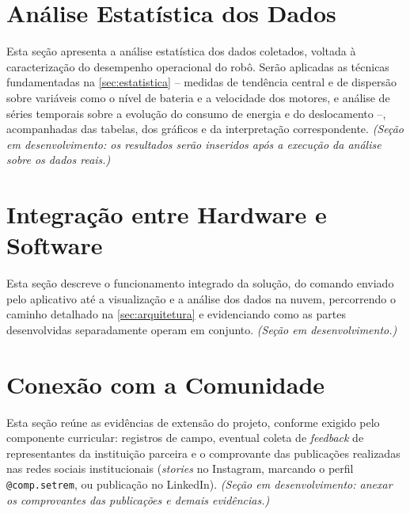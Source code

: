 \section{Análise Estatística dos Dados} \label{sec:analise_estatistica}
Esta seção apresenta a análise estatística dos dados coletados, voltada à caracterização do desempenho operacional do robô. Serão aplicadas as técnicas fundamentadas na \autoref{sec:estatistica} -- medidas de tendência central e de dispersão \cite{bussab2017} sobre variáveis como o nível de bateria e a velocidade dos motores, e análise de séries temporais \cite{morettin2018} sobre a evolução do consumo de energia e do deslocamento --, acompanhadas das tabelas, dos gráficos e da interpretação correspondente. \textit{(Seção em desenvolvimento: os resultados serão inseridos após a execução da análise sobre os dados reais.)}

\section{Integração entre Hardware e Software} \label{sec:integracao}
Esta seção descreve o funcionamento integrado da solução, do comando enviado pelo aplicativo até a visualização e a análise dos dados na nuvem, percorrendo o caminho detalhado na \autoref{sec:arquitetura} e evidenciando como as partes desenvolvidas separadamente operam em conjunto. \textit{(Seção em desenvolvimento.)}

\section{Conexão com a Comunidade} \label{sec:comunidade}
Esta seção reúne as evidências de extensão do projeto, conforme exigido pelo componente curricular: registros de campo, eventual coleta de \textit{feedback} de representantes da instituição parceira e o comprovante das publicações realizadas nas redes sociais institucionais (\textit{stories} no Instagram, marcando o perfil \texttt{@comp.setrem}, ou publicação no LinkedIn). \textit{(Seção em desenvolvimento: anexar os comprovantes das publicações e demais evidências.)}
